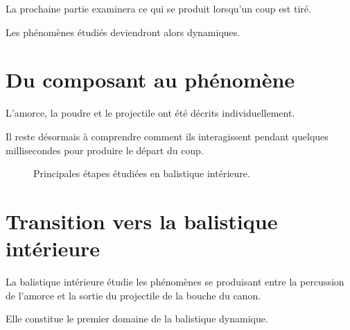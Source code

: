 La prochaine partie examinera ce qui se produit lorsqu'un coup est tiré.

Les phénomènes étudiés deviendront alors dynamiques.

\section{Du composant au phénomène}

L'amorce, la poudre et le projectile ont été décrits individuellement.

Il reste désormais à comprendre comment ils interagissent pendant quelques
millisecondes pour produire le départ du coup.

\begin{figure}[htbp]
\centering


\caption{Principales étapes étudiées en balistique intérieure.}
\label{fig:chronologie_depart_coup}

\end{figure}

\section{Transition vers la balistique intérieure}

La balistique intérieure étudie les phénomènes se produisant entre la
percussion de l'amorce et la sortie du projectile de la bouche du canon.

Elle constitue le premier domaine de la balistique dynamique.


